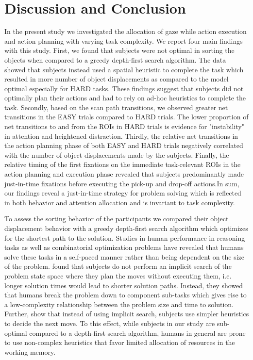 \section{Discussion and Conclusion}

In the present study we investigated the allocation of gaze while action execution and action planning with varying task complexity. We report four main findings with this study. First, we found that subjects were not optimal in sorting the objects when compared to a greedy depth-first search algorithm. The data showed that subjects instead used a spatial heuristic to complete the task which resulted in more number of object displacements as compared to the model optimal especially for HARD tasks. These findings suggest that subjects did not optimally plan their actions and had to rely on ad-hoc heuristics to complete the task. Secondly, based on the scan path transitions, we observed greater net transitions in the EASY trials compared to HARD trials. The lower proportion of net transitions to and from the ROIs in HARD trials is evidence for "instability" in attention and heightened distraction. Thirdly, the relative net transitions in the action planning phase of both EASY and HARD trials negatively correlated with the number of object displacements made by the subjects. Finally, the relative timing of the first fixations on the immediate task-relevant ROIs in the action planning and execution phase revealed that subjects predominantly made just-in-time fixations before executing the pick-up and drop-off actions.In sum, our findings reveal a just-in-time strategy for problem solving which is reflected in both behavior and attention allocation and is invariant to task complexity.

To assess the sorting behavior of the participants we compared their object displacement behavior with a greedy depth-first search algorithm which optimizes for the shortest path to the solution. Studies in human performance in reasoning tasks as well as combinatorial optimization problems \citep{MacGregor2011-yf} have revealed that humans solve these tasks in a self-paced manner rather than being dependent on the size of the problem. \citet{Pizlo2005-qi} found that subjects do not perform an implicit search of the problem state space where they plan the moves without executing them, i.e. longer solution times would lead to shorter solution paths. Instead, they showed that humans break the problem down to component sub-tasks which gives rise to a low-complexity relationship between the problem size and time to solution. Further, \citet{Pizlo2005-qi} show that instead of using implicit search, subjects use simpler heuristics to decide the next move. To this effect, while subjects in our study are sub-optimal compared to a depth-first search algorithm, humans in general are prone to use non-complex heuristics that favor limited allocation of resources in the working memory.

